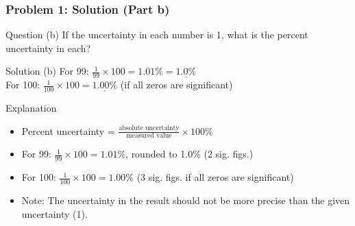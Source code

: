 \documentclass{beamer}
\begin{document}
\begin{frame}
\frametitle{Problem 1: Solution (Part b)}
\begin{block}{Question}
(b) If the uncertainty in each number is 1, what is the percent uncertainty in each?\\
\end{block}
\begin{block}{Solution}
(b) For 99: $\frac{1}{99} \times 100 = 1.01\% = \underline{1.0\%}$\\
   For 100: $\frac{1}{100} \times 100 = \underline{1.00\%}$ (if all zeros are significant)
\end{block}
\begin{block}{Explanation}
\begin{itemize}
\item Percent uncertainty = $\frac{\text{absolute uncertainty}}{\text{measured value}} \times 100\%$
\item For 99: $\frac{1}{99} \times 100 = 1.01\%$, rounded to 1.0\% (2 sig. figs.)
\item For 100: $\frac{1}{100} \times 100 = 1.00\%$ (3 sig. figs. if all zeros are significant)
\item Note: The uncertainty in the result should not be more precise than the given uncertainty (1).
\end{itemize}
\end{block}
\end{frame}
\end{document}
